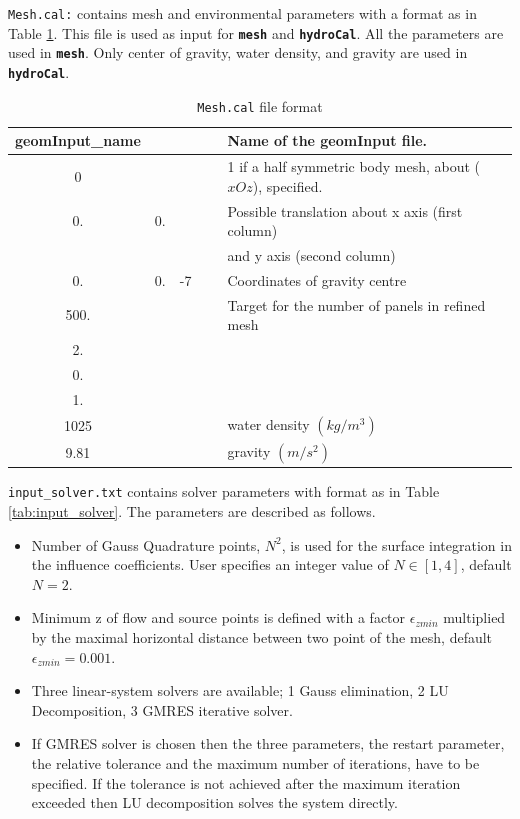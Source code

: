 \documentclass[12pt,a4paper,titlepage]{article}
\begin{document}
\noindent
\texttt{Mesh.cal:} contains mesh and environmental parameters with a format as in Table \ref{tab:meshcal}. This file is used as input for \textbf{\texttt{mesh}} and \textbf{\texttt{hydroCal}}. All the parameters are used in \textbf{\texttt{mesh}}. Only center of gravity, water density, and gravity are used in \textbf{\texttt{hydroCal}}.\\

\begin{table}[ht]
\begin{center}
\caption{\texttt{Mesh.cal} file format}\label{tab:meshcal}
\begin{tabular}{ccccl}
\hline
geomInput\_name &\ &\ &\ & Name of the geomInput file.\\
\hline
0 &\ &\ &\ & 1 if a half symmetric body mesh, about ($xOz$), specified.\\
\hline
0. &0. &\ &\ & Possible translation about x axis (first column)\\
\    &\      &\     &\ & and y axis (second column)\\
\hline
0. &0. &-7 &\ & Coordinates of gravity centre \\
\hline
500. &\ &\ &\ & Target for the number of panels in refined mesh \\
\hline
2. &\ &\ &\ &  \\
\hline
0. &\ &\ &\ &  \\
\hline
1. &\ &\ &\ &  \\
\hline
1025 &\ &\ &\ & water density $(kg/m^3)$\\
\hline
9.81 &\ &\ &\ &gravity $(m/s^2)$\\
\hline
\end{tabular}
\end{center}
\end{table}

\noindent
\texttt{input\_solver.txt} contains solver parameters with format as in Table \ref{tab:input_solver}. The parameters are described as follows.
\begin{itemize}
\item Number of Gauss Quadrature points, $N^2$, is used for the surface integration in the influence coefficients. User specifies an integer value of $N\in [1,4]$, default $N=2$.
\item Minimum z of flow and source points is defined with a factor  $\epsilon_{zmin}$ multiplied by the maximal horizontal distance between two point of the mesh, default $\epsilon_{zmin}=0.001$.
\item Three linear-system solvers are available; 1 Gauss elimination, 2 LU Decomposition, 3 GMRES iterative solver.
\item If GMRES solver is chosen then the three parameters, the restart parameter, the relative tolerance and the maximum number of iterations, have to be specified. If the tolerance is not achieved after the maximum iteration exceeded then LU decomposition solves the system directly.\\
\end{itemize}
\end{document}
